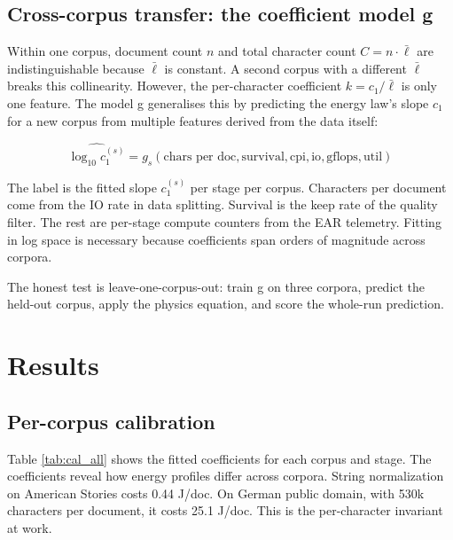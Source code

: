 \documentclass[12pt,a4paper]{article}
\begin{document}
\subsection{Cross-corpus transfer: the coefficient model g}

Within one corpus, document count $n$ and total character count $C = n \cdot \bar\ell$ are indistinguishable because $\bar\ell$ is constant. A second corpus with a different $\bar\ell$ breaks this collinearity. However, the per-character coefficient $k = c_1 / \bar\ell$ is only one feature. The model g generalises this by predicting the energy law's slope $c_1$ for a new corpus from multiple features derived from the data itself:

\[
\widehat{\log_{10} c_1^{(s)}} = g_s(\text{chars per doc}, \text{survival}, \text{cpi}, \text{io}, \text{gflops}, \text{util})
\]

The label is the fitted slope $c_1^{(s)}$ per stage per corpus. Characters per document come from the IO rate in data splitting. Survival is the keep rate of the quality filter. The rest are per-stage compute counters from the EAR telemetry. Fitting in log space is necessary because coefficients span orders of magnitude across corpora.

The honest test is leave-one-corpus-out: train g on three corpora, predict the held-out corpus, apply the physics equation, and score the whole-run prediction.

\section{Results}
\label{sec:results}

\subsection{Per-corpus calibration}

Table \ref{tab:cal_all} shows the fitted coefficients for each corpus and stage. The coefficients reveal how energy profiles differ across corpora. String normalization on American Stories costs 0.44 J/doc. On German public domain, with 530k characters per document, it costs 25.1 J/doc. This is the per-character invariant at work.
\end{document}
